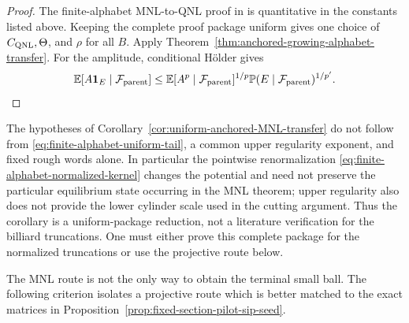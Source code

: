 \documentclass[11pt]{article}
\newcommand{\one}{\mathbf 1}
\begin{document}
\begin{proof}
The finite-alphabet MNL-to-QNL proof in
\cite[Section~6.1]{LPS} is quantitative in the constants listed above.
Keeping the complete proof package uniform gives one choice of
$C_{\rm QNL},\Theta$, and $\rho$ for all $B$.  Apply
Theorem~\ref{thm:anchored-growing-alphabet-transfer}.  For
the amplitude, conditional H\"older gives
\[
 \mathbb E[A\one_E\mid\mathcal F_{\rm parent}]
 \le
 \mathbb E[A^p\mid\mathcal F_{\rm parent}]^{1/p}
 \mathbb P(E\mid\mathcal F_{\rm parent})^{1/p'}.
\]
\end{proof}

The hypotheses of Corollary~\ref{cor:uniform-anchored-MNL-transfer} do not
follow from \eqref{eq:finite-alphabet-uniform-tail}, a common upper
regularity exponent, and fixed rough words alone.  In particular the
pointwise renormalization \eqref{eq:finite-alphabet-normalized-kernel}
changes the potential and need not preserve the particular equilibrium
state occurring in the MNL theorem; upper regularity also does not provide
the lower cylinder scale used in the cutting argument.  Thus the corollary
is a uniform-package reduction, not a literature verification for the
billiard truncations.  One must either prove this complete package for the
normalized truncations or use the projective route below.

The MNL route is not the only way to obtain the terminal small ball.  The
following criterion isolates a projective route which is better matched to
the exact matrices in
Proposition~\ref{prop:fixed-section-pilot-sip-seed}.
\end{document}
